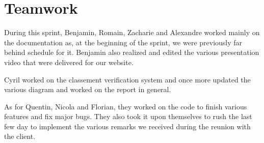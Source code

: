 \section{Teamwork}

During this sprint, Benjamin, Romain, Zacharie and Alexandre worked mainly on the documentation as, at the beginning of the sprint, we were previously far behind schedule for it. Benjamin also realized and edited the various presentation video that were delivered for our website. \newline

Cyril worked on the classement verification system and once more updated the various diagram and worked on the report in general. \newline

As for Quentin, Nicola and Florian, they worked on the code to finish various features and fix major bugs. They also took it upon themselves to rush the last few day to implement the various remarks we received during the reunion with the client.
